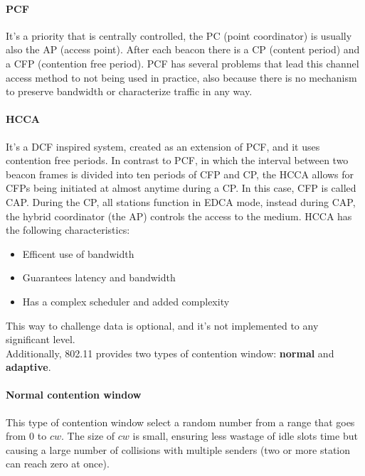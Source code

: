 \paragraph*{PCF} It's a priority that is centrally controlled, the PC (point
coordinator) is usually also the AP (access point).
After each beacon there is a CP (content period) and a CFP (contention free
period). PCF has several problems that lead this channel access method to not
being used in practice, also because there is no mechanism to preserve bandwidth
or characterize traffic in any way.

\paragraph*{HCCA} It's a DCF inspired system, created as an extension of PCF,
and it uses contention free periods. In contrast to PCF, in which the interval
between two beacon frames is divided into ten periods of CFP and CP, the HCCA
allows for CFPs being initiated at almost anytime during a CP. In this case,
CFP is called CAP. During the CP, all stations function in EDCA mode, instead
during CAP, the hybrid coordinator (the AP) controls the access to the medium.
HCCA has the following characteristics:
\begin{itemize}
\item Efficent use of bandwidth
\item Guarantees latency and bandwidth
\item Has a complex scheduler and added complexity
\end{itemize}

This way to challenge data is optional, and it's not implemented to any
significant level.\\[5pt]


\noindent Additionally, 802.11 provides two types of contention window:
\textbf{normal} and
\textbf{adaptive}.

\paragraph*{Normal contention window} This type of contention window select a
random number from a range that goes from 0 to $cw$. The size of $cw$ is small, ensuring less
wastage of idle slots time but causing a large number of collisions with
multiple senders (two or more station can reach zero at once).

